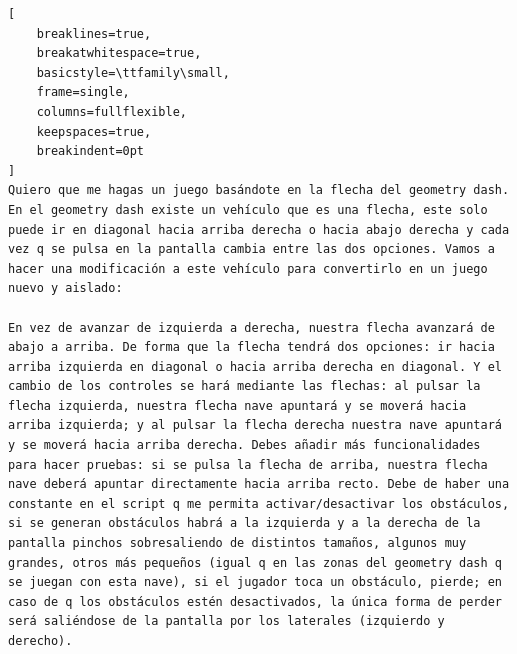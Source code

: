 \begin{lstlisting}[
    breaklines=true,
    breakatwhitespace=true,
    basicstyle=\ttfamily\small,
    frame=single,
    columns=fullflexible,
    keepspaces=true,
    breakindent=0pt
]
Quiero que me hagas un juego basándote en la flecha del geometry dash. En el geometry dash existe un vehículo que es una flecha, este solo puede ir en diagonal hacia arriba derecha o hacia abajo derecha y cada vez q se pulsa en la pantalla cambia entre las dos opciones. Vamos a hacer una modificación a este vehículo para convertirlo en un juego nuevo y aislado:

En vez de avanzar de izquierda a derecha, nuestra flecha avanzará de abajo a arriba. De forma que la flecha tendrá dos opciones: ir hacia arriba izquierda en diagonal o hacia arriba derecha en diagonal. Y el cambio de los controles se hará mediante las flechas: al pulsar la flecha izquierda, nuestra flecha nave apuntará y se moverá hacia arriba izquierda; y al pulsar la flecha derecha nuestra nave apuntará y se moverá hacia arriba derecha. Debes añadir más funcionalidades para hacer pruebas: si se pulsa la flecha de arriba, nuestra flecha nave deberá apuntar directamente hacia arriba recto. Debe de haber una constante en el script q me permita activar/desactivar los obstáculos, si se generan obstáculos habrá a la izquierda y a la derecha de la pantalla pinchos sobresaliendo de distintos tamaños, algunos muy grandes, otros más pequeños (igual q en las zonas del geometry dash q se juegan con esta nave), si el jugador toca un obstáculo, pierde; en caso de q los obstáculos estén desactivados, la única forma de perder será saliéndose de la pantalla por los laterales (izquierdo y derecho). 

\end{lstlisting}
